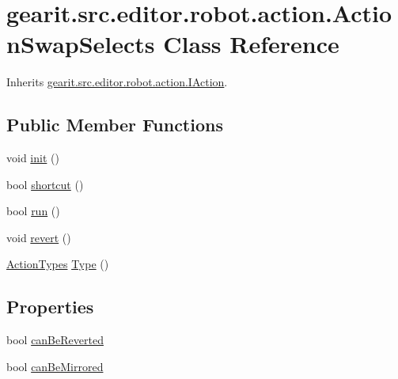 \hypertarget{classgearit_1_1src_1_1editor_1_1robot_1_1action_1_1_action_swap_selects}{\section{gearit.\+src.\+editor.\+robot.\+action.\+Action\+Swap\+Selects Class Reference}
\label{classgearit_1_1src_1_1editor_1_1robot_1_1action_1_1_action_swap_selects}
}


Inherits \hyperlink{interfacegearit_1_1src_1_1editor_1_1robot_1_1action_1_1_i_action}{gearit.\+src.\+editor.\+robot.\+action.\+I\+Action}.

\subsection*{Public Member Functions}
\begin{DoxyCompactItemize}
\item 
void \hyperlink{classgearit_1_1src_1_1editor_1_1robot_1_1action_1_1_action_swap_selects_abdf69bd70de4b6192305d24c82fad5a3}{init} ()
\item 
bool \hyperlink{classgearit_1_1src_1_1editor_1_1robot_1_1action_1_1_action_swap_selects_a4e0a8f7f05041e4a88c8bf8c7b220145}{shortcut} ()
\item 
bool \hyperlink{classgearit_1_1src_1_1editor_1_1robot_1_1action_1_1_action_swap_selects_a9ae24d29dddddb24fefc8a3d2c89809c}{run} ()
\item 
void \hyperlink{classgearit_1_1src_1_1editor_1_1robot_1_1action_1_1_action_swap_selects_a64b7d9e94276f4c3c92fa710559ba2f1}{revert} ()
\item 
\hyperlink{namespacegearit_1_1src_1_1editor_1_1robot_1_1action_a4be0fd46e3952d6135136b20e7b3fc5e}{Action\+Types} \hyperlink{classgearit_1_1src_1_1editor_1_1robot_1_1action_1_1_action_swap_selects_abf02cd8fd17f21af09be88dbda79ecbf}{Type} ()
\end{DoxyCompactItemize}
\subsection*{Properties}
\begin{DoxyCompactItemize}
\item 
bool \hyperlink{classgearit_1_1src_1_1editor_1_1robot_1_1action_1_1_action_swap_selects_a3e1fcc1e5a5cbd66a6a7663b73184b98}{can\+Be\+Reverted}
\item 
bool \hyperlink{classgearit_1_1src_1_1editor_1_1robot_1_1action_1_1_action_swap_selects_ac62ecd4168fc9843d1bd3ca036115dcb}{can\+Be\+Mirrored}
\end{DoxyCompactItemize}



